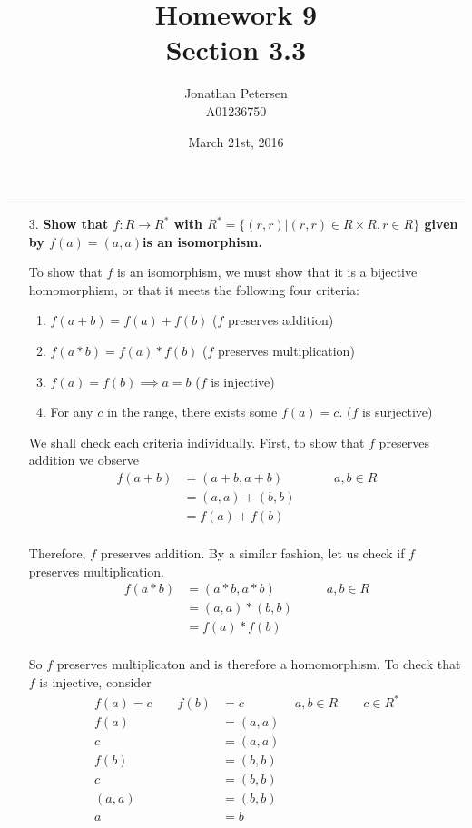 \documentclass{article}
\title{Homework 9 \\ Section 3.3}
\author{Jonathan Petersen \\ A01236750}
\date{March 21st, 2016}
\begin{document}
	\maketitle
	\hrule 
	\vspace{5mm}
	\begin{enumerate}
		\item [3.] \textbf{Show that $f:R \rightarrow R^*$ with $R^* = \lbrace (r, r) | (r, r) \in 
						   R \times R, r \in R \rbrace$ given by $f(a) = (a, a) $is an isomorphism.}

			To show that $f$ is an isomorphism, we must show that it is a bijective homomorphism, or
			that it meets the following four criteria:
			\begin{enumerate}
				\item $f(a + b) = f(a) + f(b)$ ($f$ preserves addition) \\
				\item $f(a * b) = f(a) * f(b)$ ($f$ preserves multiplication) \\
				\item $f(a) = f(b) \implies a = b$ ($f$ is injective) \\
				\item For any $c$ in the range, there exists some $f(a) = c$. ($f$ is surjective)
			\end{enumerate}

			We shall check each criteria individually. First, to show that $f$ preserves addition we
			observe
			\begin{align*}
				f(a + b) & = (a + b, a + b) \qquad \qquad a, b \in R \\
						 & = (a, a) + (b, b) \\
						 & = f(a) + f(b) \\
			\end{align*}

			Therefore, $f$ preserves addition. By a similar fashion, let us check if $f$ preserves
			multiplication.
			\begin{align*}
				f(a * b) & = (a * b, a * b) \qquad \qquad a, b \in R \\
						 & = (a, a) * (b, b) \\
						 & = f(a) * f(b) \\
 			\end{align*}

 			So $f$ preserves multiplicaton and is therefore a homomorphism. To check that $f$ is 
 			injective, consider
 			\begin{align*}
 				f(a) = c \qquad f(b) & = c \qquad \qquad a, b \in R \qquad c \in R^* \\
 				f(a) & = (a, a) \\
 				c & = (a, a) \\
 				f(b) & = (b, b) \\
 				c & = (b, b) \\
 				(a, a) & = (b, b) \\
 				a & = b \\
 			\end{align*}


\end{enumerate}
\end{document}
